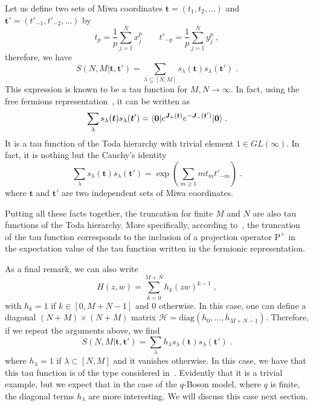 \documentclass[a4paper,11pt]{amsart}
\begin{document}
Let us define two sets of Miwa coordinates \(\bm{t} = (t_1, t_2, \dots)\)
and \(\bm{t}' = (t'_{-1}, t'_{-2}, \dots)\) by
\begin{equation}
  t_p = \frac{1}{p}\sum_{j=1}^N x_j^p\qquad 
  t'_{-p} = \frac{1}{p}\sum_{j=1}^N y_j^p\; ,
\end{equation}
therefore, we have 
\begin{equation}
  S(N, M|\bm{t}, \bm{t}') = \sum_{\lambda\subseteq [N,M]} s_\lambda(\bm{t}) s_\lambda(\bm{t}') \; .
\end{equation}
This expression is known to be a tau function for \(M, N\to \infty\).
In fact, using the free fermions representation~\cite{Alexandrov:2012tr},
it can be written as
\begin{equation}
\sum_{\lambda } s_{\lambda}(\bm{t}) s_{\lambda}(\bm{t}')
 = \langle\bm{0}\rvert e^{\bm{J}_+(\bm{t})} e^{-\bm{J}_-(\bm{t}')} \lvert\bm{0}\rangle\; .
\end{equation}
It is a tau function of the Toda hierarchy with trivial element \(1 \in GL(\infty)\).
In fact, it is nothing but the Cauchy's identity
\begin{equation}
  \sum_{\lambda } s_{\lambda}(\bm{t}) s_{\lambda}(\bm{t}')
    = \exp \left( \sum_{m\geq1} m t_m t'_{-m} \right) \; .
\end{equation}
where \(\bm{t}\) and \(\bm{t}'\) are two independent sets of Miwa coordinates.

Putting all these facts together, the truncation for finite \(M\) and
\(N\) are also tau functions of the Toda hierarchy. More specifically,
according to~\cite{Alexandrov:2012tr, Kharchev:1991gd,
  Zabrodin:2010ii}, the truncation of the tau function corresponds to
the inclusion of a projection operator \(\mathrm{P}^+\) in the
expectation value of the tau function written in the fermionic
representation.

As a final remark, we can also write
\begin{equation}
  H(z,w) = \sum_{k=0}^{M+N} h_k(zw)^{k-1} \; , 
\end{equation}
with \(h_k=1\) if \(k\in [0, M+N-1]\) and \(0\) otherwise. In this
case, one can define a diagonal \((N+M)\times (N+M)\) matrix
\(\mathcal{H} = \textrm{diag}(h_0, \dots, h_{M+N-1})\). Therefore, if
we repeat the arguments above, we find
\begin{equation}
S(N, M|\bm{t}, \bm{t}') = \sum_{\lambda} h_\lambda s_\lambda(\bm{t}) s_\lambda(\bm{t}') \; .
\end{equation}
where \(h_\lambda = 1\) if \(\lambda \subset [N,M]\) and it vanishes
otherwise.  In this case, we have that this tau function is of the
type considered in~\cite{orlov:2001}. Evidently that it is a trivial
example, but we expect that in the case of the \(q\)-Boson model,
where \(q\) is finite, the diagonal terms \(h_\lambda\) are more
interesting. We will discuss this case next section.
\end{document}

